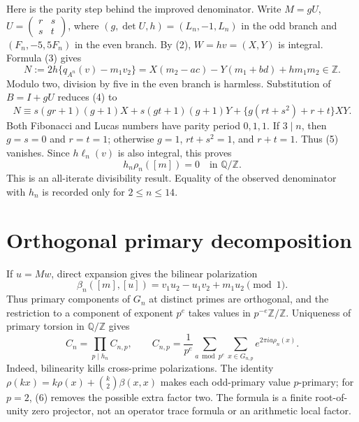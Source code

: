 \documentclass[10pt]{article}
\begin{document}
Here is the parity step behind the improved denominator.  Write
$M=gU$, $U=(\begin{smallmatrix}r&s\\s&t\end{smallmatrix})$, where
$(g,\det U,h)=(L_n,-1,L_n)$ in the odd branch and
$(F_n,-5,5F_n)$ in the even branch.  By (2), $W=hv=(X,Y)$ is integral.
Formula (3) gives
\[
N:=2h\{q_{A^n}(v)-m_1v_2\}
=X(m_2-ac)-Y(m_1+bd)+hm_1m_2\in\mathbb Z.        \tag{4}
\]
Modulo two, division by five in the even branch is harmless.  Substitution
of $B=I+gU$ reduces (4) to
\[
N\equiv s(gr+1)(g+1)X+s(gt+1)(g+1)Y
 +\{g(rt+s^2)+r+t\}XY.                           \tag{5}
\]
Both Fibonacci and Lucas numbers have parity period $0,1,1$.  If $3\mid n$,
then $g=s=0$ and $r=t=1$; otherwise $g=1$, $rt+s^2=1$, and $r+t=1$.
Thus (5) vanishes.  Since $h\ell_n(v)$ is also integral, this proves
\[
h_n\rho_n([m])=0\quad\text{in }\mathbb Q/\mathbb Z.             \tag{6}
\]
This is an all-iterate divisibility result.  Equality of the observed
denominator with $h_n$ is recorded only for $2\le n\le14$.

\section{Orthogonal primary decomposition}
If $u=Mw$, direct expansion gives the bilinear polarization
\[
\beta_n([m],[u])=v_1u_2-u_1v_2+m_1u_2\pmod1.                   \tag{7}
\]
Thus primary components of
$G_n$ at distinct primes are orthogonal, and the restriction to a component
of exponent $p^e$ takes values in $p^{-e}\mathbb Z/\mathbb Z$.  Uniqueness of
primary torsion in $\mathbb Q/\mathbb Z$ gives
\[
C_n=\prod_{p\mid h_n}C_{n,p},\qquad
C_{n,p}=\frac1{p^e}\sum_{a\bmod p^e}\sum_{x\in G_{n,p}}
e^{2\pi i a\rho_n(x)}.                                         \tag{8}
\]
Indeed, bilinearity kills cross-prime polarizations.  The identity
$\rho(kx)=k\rho(x)+\binom{k}{2}\beta(x,x)$ makes each odd-primary value
$p$-primary; for $p=2$, (6) removes the possible extra factor two.
The formula is a finite root-of-unity zero projector, not an operator trace
formula or an arithmetic local factor.
\end{document}

